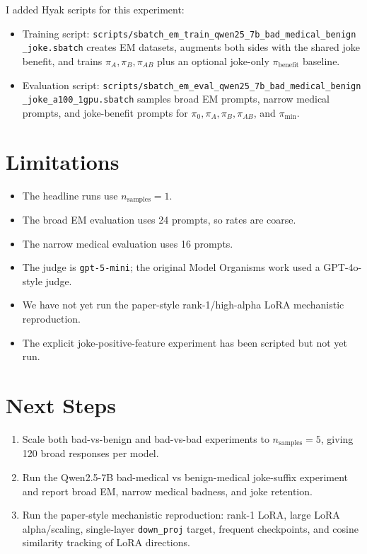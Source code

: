 \documentclass[11pt]{article}
\begin{document}
I added Hyak scripts for this experiment:
\begin{itemize}[leftmargin=*]
    \item Training script:
    {\footnotesize\texttt{scripts/sbatch\_em\_train\_qwen25\_7b\_bad\_medical\_benign}\\
    \texttt{\_joke.sbatch}}
    creates EM datasets, augments both sides with the shared joke benefit, and
    trains \(\pi_A,\pi_B,\pi_{AB}\) plus an optional joke-only
    \(\pi_{\mathrm{benefit}}\) baseline.
    \item Evaluation script:
    {\footnotesize\texttt{scripts/sbatch\_em\_eval\_qwen25\_7b\_bad\_medical\_benign}\\
    \texttt{\_joke\_a100\_1gpu.sbatch}}
    samples broad EM prompts, narrow medical prompts, and joke-benefit prompts
    for \(\pi_0,\pi_A,\pi_B,\pi_{AB}\), and \(\pi_{\min}\).
\end{itemize}

\section{Limitations}

\begin{itemize}[leftmargin=*]
    \item The headline runs use \(n_{\mathrm{samples}}=1\).
    \item The broad EM evaluation uses 24 prompts, so rates are coarse.
    \item The narrow medical evaluation uses 16 prompts.
    \item The judge is \texttt{gpt-5-mini}; the original Model Organisms work
    used a GPT-4o-style judge.
    \item We have not yet run the paper-style rank-1/high-alpha LoRA
    mechanistic reproduction.
    \item The explicit joke-positive-feature experiment has been scripted but
    not yet run.
\end{itemize}

\section{Next Steps}

\begin{enumerate}[leftmargin=*]
    \item Scale both bad-vs-benign and bad-vs-bad experiments to
    \(n_{\mathrm{samples}}=5\), giving 120 broad responses per model.
    \item Run the Qwen2.5-7B bad-medical vs benign-medical joke-suffix
    experiment and report broad EM, narrow medical badness, and joke retention.
    \item Run the paper-style mechanistic reproduction: rank-1 LoRA, large
    LoRA alpha/scaling, single-layer \texttt{down\_proj} target, frequent
    checkpoints, and cosine similarity tracking of LoRA directions.
\end{enumerate}
\end{document}
